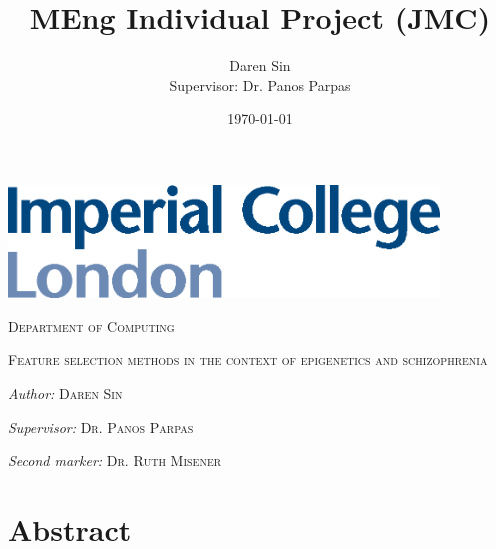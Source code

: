 \documentclass[12pt, twoside, a4paper]{report}
\title{MEng Individual Project (JMC)}
\author{Daren Sin \\  Supervisor: Dr. Panos Parpas}
\date{\today}
\newcommand\blankpage{%
    \null
    \thispagestyle{empty}%
    \addtocounter{page}{-1}%
    \newpage}
\begin{document}
\begin{titlingpage}

\vspace*{1.5cm}

\begin{center}
\includegraphics[height=3cm]{images/imperial}
\end{center}

\vspace{1.5cm}
\begin{center}
\Large

\textsc{Department of Computing}
\end{center}

\vspace{2cm}

\begin{center}
\Large \textsc{\thetitle}

\vspace{2cm}

\textsc{Feature selection methods in the context of epigenetics and schizophrenia}
\end{center}

\vspace{2cm}

\begin{center}
\large \textit{Author:} \textsc{Daren Sin}

\textit{Supervisor:} \textsc{Dr. Panos Parpas}

\textit{Second marker:} \textsc{Dr. Ruth Misener}
\end{center}

\vspace{2cm}

\begin{center}
\normalsize \textsc{\thedate}
\end{center}

\end{titlingpage}


\afterpage{\blankpage}

\onehalfspacing
\chapter*{Abstract}
\end{document}
